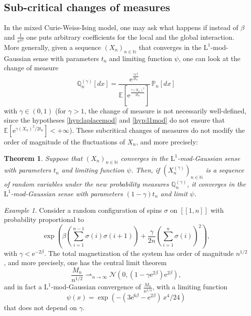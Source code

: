 \documentclass[12pt,a4paper,reqno]{amsart}
\newcommand{\N}{\mathbb{N}}
\newcommand{\E}{\mathrm{e}}
\newcommand{\esper}{\mathbb{E}}
\newcommand{\proba}{\mathbb{P}}
\newcommand{\qproba}{\mathbb{Q}}
\newcommand{\lle}{\left[\!\left[}
\newcommand{\rre}{\right]\!\right]}
\newtheorem{theorem}{Theorem}
\theoremstyle{remark}
\newtheorem*{example}{Example}
\begin{document}
\subsection{Sub-critical changes of measures}
In the mixed Curie-Weiss-Ising model, one may ask  what happens if instead of $\beta$ and $\frac{1}{\E^{2\beta}}$ one puts arbitrary coefficients for the local and the global interaction. More generally, given a sequence $(X_n)_{n \in \N}$ that converges in the $\mathrm{L}^{1}$-mod-Gaussian sense with parameters $t_n$ and limiting function $\psi$, one can look at the change of measure
$$\qproba_{n}^{(\gamma)}[dx]=\frac{\E^{\frac{\gamma x^2}{2t_n}}}{\esper\!\left[\E^{\frac{\gamma (X_n)^2}{2t_n}}\right]}\,\proba_n[dx]$$
with $\gamma \in (0,1)$ (for $\gamma >1$, the change of measure is not necessarily well-defined, since the hypotheses \eqref{hyp:laplacemod} and \eqref{hyp:l1mod} do not ensure that $\esper[\E^{\gamma (X_n)^2/2t_n}] < + \infty$). These subcritical changes of measures do not modify the order of magnitude of the fluctuations of $X_n$, and more precisely:

\begin{theorem}\label{thm:subcritical}
Suppose that $(X_n)_{n\in \N}$ converges in the $\mathrm{L}^1$-mod-Gaussian sense with parameters $t_n$ and limiting function $\psi$. Then, if $(X_{n}^{(\gamma)})_{n \in \N}$ is a sequence of random variables under the new probability measures $\qproba_{n}^{(\gamma)}$, it converges in the $\mathrm{L}^1$-mod-Gaussian sense with parameters $(1-\gamma)t_n$ and limit $\psi$.
\end{theorem}

\begin{example}
Consider a random configuration of spins $\sigma$ on $\lle 1,n\rre$ with probability proportional to
$$\exp\left(\beta \left(\sum_{i=1}^{n-1} \sigma(i)\sigma(i+1)\right)+\frac{\gamma}{2n} \left(\sum_{i=1}^n \sigma(i)\right)^2\right),$$
with $\gamma < \E^{-2\beta}$. The total magnetization of the system has order of magnitude $n^{1/2}$, and more precisely, one has the central limit theorem
$$\frac{M_n}{n^{1/2}} \rightharpoonup_{n \to \infty} \mathcal{N}(0,(1-\gamma\E^{2\beta})\E^{2\beta}),$$
and in fact a $\mathrm{L}^1$-mod-Gaussian convergence of $\frac{M_n}{n^{1/4}}$, with a limiting function $$\psi(x)=\exp(-(3\E^{6\beta}-\E^{2\beta})\,x^4/24)$$ that does not depend on $\gamma$.
\end{example}
\end{document}
